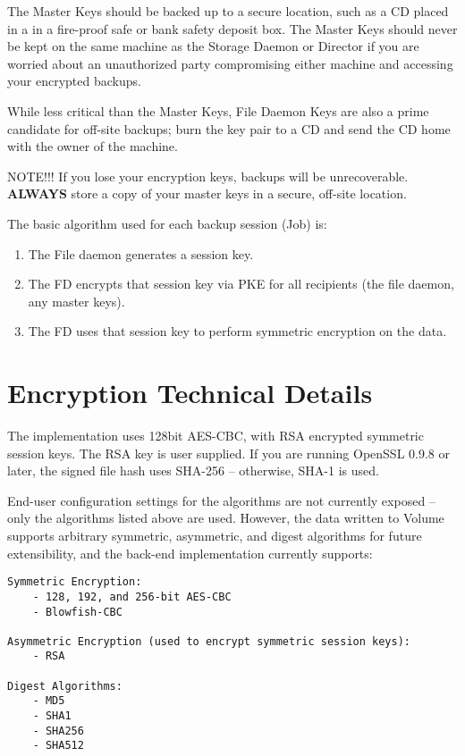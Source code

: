 The Master Keys should be backed up to a secure location, such as a CD
placed in a in a fire-proof safe or bank safety deposit box. The Master
Keys should never be kept on the same machine as the Storage Daemon or
Director if you are worried about an unauthorized party compromising either
machine and accessing your encrypted backups.

While less critical than the Master Keys, File Daemon Keys are also a prime
candidate for off-site backups; burn the key pair to a CD and send the CD
home with the owner of the machine.

NOTE!!! If you lose your encryption keys, backups will be unrecoverable.
{\bf ALWAYS} store a copy of your master keys in a secure, off-site location.

The basic algorithm used for each backup session (Job) is:
\begin{enumerate}
\item The File daemon generates a session key.
\item The FD encrypts that session key via PKE for all recipients (the file
daemon, any master keys).
\item The FD uses that session key to perform symmetric encryption on the data.
\end{enumerate}



\section{Encryption Technical Details}

The implementation uses 128bit AES-CBC, with RSA encrypted symmetric
session keys. The RSA key is user supplied.
If you are running OpenSSL 0.9.8 or later, the signed file hash uses
SHA-256 -- otherwise, SHA-1 is used.

End-user configuration settings for the algorithms are not currently
exposed -- only the algorithms listed above are used. However, the
data written to Volume supports arbitrary symmetric, asymmetric, and
digest algorithms for future extensibility, and the back-end
implementation currently supports:

\begin{verbatim}
Symmetric Encryption:
    - 128, 192, and 256-bit AES-CBC
    - Blowfish-CBC

Asymmetric Encryption (used to encrypt symmetric session keys):
    - RSA

Digest Algorithms:
    - MD5
    - SHA1
    - SHA256
    - SHA512
\end{verbatim}

